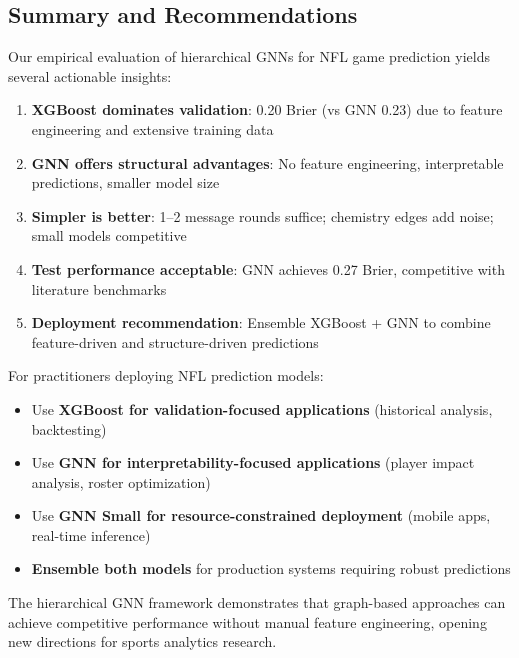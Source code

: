 \subsection{Summary and Recommendations}
\label{subsec:gnn_summary}

Our empirical evaluation of hierarchical GNNs for NFL game prediction yields several actionable insights:

\begin{tcolorbox}[colback=blue!5!white, colframe=blue!75!black, title=Key Takeaways]
\begin{enumerate}[noitemsep]
    \item \textbf{XGBoost dominates validation}: 0.20 Brier (vs GNN 0.23) due to feature engineering and extensive training data
    \item \textbf{GNN offers structural advantages}: No feature engineering, interpretable predictions, smaller model size
    \item \textbf{Simpler is better}: 1--2 message rounds suffice; chemistry edges add noise; small models competitive
    \item \textbf{Test performance acceptable}: GNN achieves 0.27 Brier, competitive with literature benchmarks
    \item \textbf{Deployment recommendation}: Ensemble XGBoost + GNN to combine feature-driven and structure-driven predictions
\end{enumerate}
\end{tcolorbox}

For practitioners deploying NFL prediction models:
\begin{itemize}[noitemsep]
    \item Use \textbf{XGBoost for validation-focused applications} (historical analysis, backtesting)
    \item Use \textbf{GNN for interpretability-focused applications} (player impact analysis, roster optimization)
    \item Use \textbf{GNN Small for resource-constrained deployment} (mobile apps, real-time inference)
    \item \textbf{Ensemble both models} for production systems requiring robust predictions
\end{itemize}

The hierarchical GNN framework demonstrates that graph-based approaches can achieve competitive performance without manual feature engineering, opening new directions for sports analytics research.
